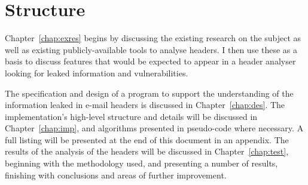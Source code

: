 \documentclass[a4paper,DIV=12,BCOR=7mm,abstract=yes,twoside,10pt]{scrreprt}
\begin{document}
\section{Structure}

Chapter~\ref{chap:exres} begins by discussing the existing research on
the subject as well as existing publicly-available tools to analyse
headers.  I then use these as a basis to discuss features that would be
expected to appear in a header analyser looking for leaked information
and vulnerabilities.

The specification and design of a program to support the understanding of the
information leaked in e-mail headers is discussed in Chapter~\ref{chap:des}.
The implementation's high-level structure and details will be discussed in
Chapter~\ref{chap:imp}, and algorithms presented in pseudo-code where
necessary.  A full listing will be presented at the end of this document in
an appendix. The results of the analysis of the headers will be discussed in
Chapter~\ref{chap:test}, beginning with the methodology used, and presenting
a number of results, finishing with conclusions and areas of further improvement.

\cleardoublepage  
\cleardoublepage  
\cleardoublepage 
\cleardoublepage  
\cleardoublepage \printbibliography{} 
\end{document}
